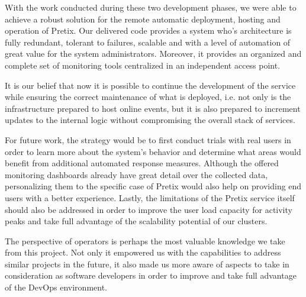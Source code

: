 \documentclass[12pt]{article}
\begin{document}
With the work conducted during these two development phases, we were able to achieve a robust solution for the remote automatic deployment, hosting and operation of Pretix.
Our delivered code provides a system who's architecture is fully redundant, tolerant to failures, scalable and with a level of automation of great value for the 
system administrators.
Moreover, it provides an organized and complete set of monitoring tools centralized in an independent access point.

It is our belief that now it is possible to continue the development of the service while ensuring the correct maintenance of what is deployed, i.e. not only 
is the infrastructure prepared to host online events, but it is also prepared to increment updates to the internal logic without compromising the overall stack 
of services.

For future work, the strategy would be to first conduct trials with real users in order to learn more about the system's behavior and determine what areas would 
benefit from additional automated response measures.
Although the offered monitoring dashboards already have great detail over the collected data, personalizing them to the specific case of Pretix would also help 
on providing end users with a better experience.
Lastly, the limitations of the Pretix service itself should also be addressed in order to improve the user load capacity for activity peaks and take full advantage 
of the scalability potential of our clusters.

The perspective of operators is perhaps the most valuable knowledge we take from this project.
Not only it empowered us with the capabilities to address similar projects in the future, it also made us more aware of aspects to take in consideration as 
software developers in order to improve and take full advantage of the DevOps environment.
\end{document}
